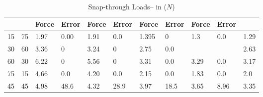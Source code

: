 \documentclass[journal]{new-aiaa}
\begin{document}
\begin{table}[!h]
\begin{tabular}{@{}lllllllllll@{}}
		{}	         & {}     &Force &Error  &Force &Error  &Force &Error  &Force &Error &{} \\ \hline
		15         & 75        & 1.97
		&  0.00                                                & 1.91                                                 & 0.0                                                 & 1.395                                                 & 0                                                & 1.3                                                & 0.0         &1.29                                        \\
		30         & 60        & 3.36                                                 & 0                                                 & 3.24                                                  & 0                                                  &2.75                                                  &0.0                                                 &                                                  &        &2.63                                           \\ 
		60         & 30        & 6.22                                                 &0                                                  &5.56                                                      & 0                                                 &  3.31                                             &  0.0                                                & 3.29                                                 &0.0   &3.17                                                \\ 
		75         & 15        &4.66                                                  &0.0                                                  & 4.20                                               &0.0                                                   & 2.15                                                 &0.0                                                 &1.83                                                  & 0.0   &2.0                                             \\ 
		45         & 45        & 4.98                                                 & 48.6                                                 &   4.32                                               & 28.9                                                 & 3.97                                                 & 18.5                                                 & 3.65                                                 &  8.96      &3.35                                          \\ \hline
	\end{tabular}
	\label{disp}
	\caption{Snap-through Loads-- in ($N$)}
\end{table}
\end{document}
